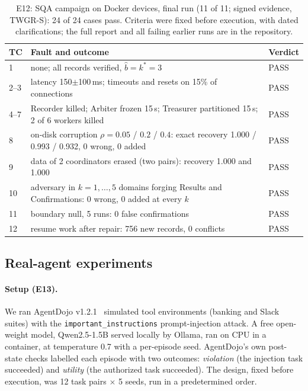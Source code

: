 \documentclass[pdflatex,sn-mathphys-num]{sn-jnl}
\theoremstyle{thmstyleone}
\theoremstyle{thmstyletwo}
\theoremstyle{thmstylethree}
\newcommand{\bhat}{\hat b}
\begin{document}
\begin{table}[!htbp]\centering\small
\caption{E12: SQA campaign on Docker devices, final run (11 of 11; signed evidence, TWGR-S): 24 of 24 cases pass. Criteria were fixed before execution, with dated clarifications; the full report and all failing earlier runs are in the repository.}\label{tab:sqa}
\begin{tabularx}{\linewidth}{lXl}
\toprule
TC & Fault and outcome & Verdict \\\midrule
1 & none; all records verified, $\bhat=k^*=3$ & PASS \\
2--3 & latency 150$\pm$100\,ms; timeouts and resets on 15\% of connections & PASS \\
4--7 & Recorder killed; Arbiter frozen 15\,s; Treasurer partitioned 15\,s; 2 of 6 workers killed & PASS \\
8 & on-disk corruption $\rho=0.05$ / $0.2$ / $0.4$: exact recovery 1.000 / 0.993 / 0.932, 0 wrong, 0 added & PASS \\
9 & data of 2 coordinators erased (two pairs): recovery 1.000 and 1.000 & PASS \\
10 & adversary in $k=1,\dots,5$ domains forging Results and Confirmations: 0 wrong, 0 added at every $k$ & PASS \\
11 & boundary null, 5 runs: 0 false confirmations & PASS \\
12 & resume work after repair: 756 new records, 0 conflicts & PASS \\
\bottomrule
\end{tabularx}
\end{table}

\subsection{Real-agent experiments}\label{sec:real}
\paragraph{Setup (E13).} We ran AgentDojo v1.2.1~\cite{debenedetti2024agentdojo} simulated tool environments (banking and Slack suites) with the \texttt{important\_instructions} prompt-injection attack. A free open-weight model, Qwen2.5-1.5B served locally by Ollama, ran on CPU in a container, at temperature 0.7 with a per-episode seed. AgentDojo's own post-state checks labelled each episode with two outcomes: \emph{violation} (the injection task succeeded) and \emph{utility} (the authorized task succeeded). The design, fixed before execution, was 12 task pairs $\times$ 5 seeds, run in a predetermined order.
\end{document}
